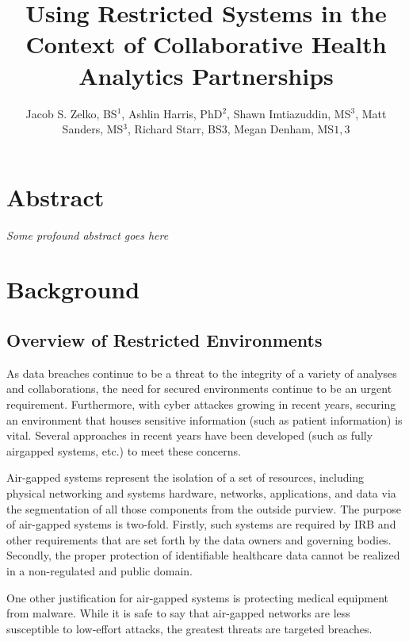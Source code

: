 \documentclass{amia}
\begin{document}
\title{Using Restricted Systems in the Context of Collaborative Health Analytics Partnerships}

\author{Jacob S. Zelko, BS$^1$, Ashlin Harris, PhD$^2$, Shawn Imtiazuddin, MS$^3$, Matt Sanders, MS$^3$, Richard Starr, BS$3$, Megan Denham, MS$1,3$}


\maketitle

\section*{Abstract}

\textit{Some profound abstract goes here}

\section*{Background}

\subsection{Overview of Restricted Environments}

As data breaches continue to be a threat to the integrity of a variety of analyses and collaborations, the need for secured environments continue to be an urgent requirement. Furthermore, with cyber attackes growing in recent years, securing an environment that houses sensitive information (such as patient information) is vital. Several approaches in recent years have been developed (such as fully airgapped systems, etc.) to meet these concerns.

Air-gapped systems represent the isolation of a set of resources, including physical networking and systems hardware, networks, applications, and data via the segmentation of all those components from the outside purview. The purpose of air-gapped systems is two-fold. Firstly, such systems are required by IRB and other requirements that are set forth by the data owners and governing bodies. Secondly, the proper protection of identifiable healthcare data cannot be realized in a non-regulated and public domain.

One other justification for air-gapped systems is protecting medical equipment from malware. While it is safe to say that air-gapped networks are less susceptible to low-effort attacks, the greatest threats are targeted breaches.
\end{document}
